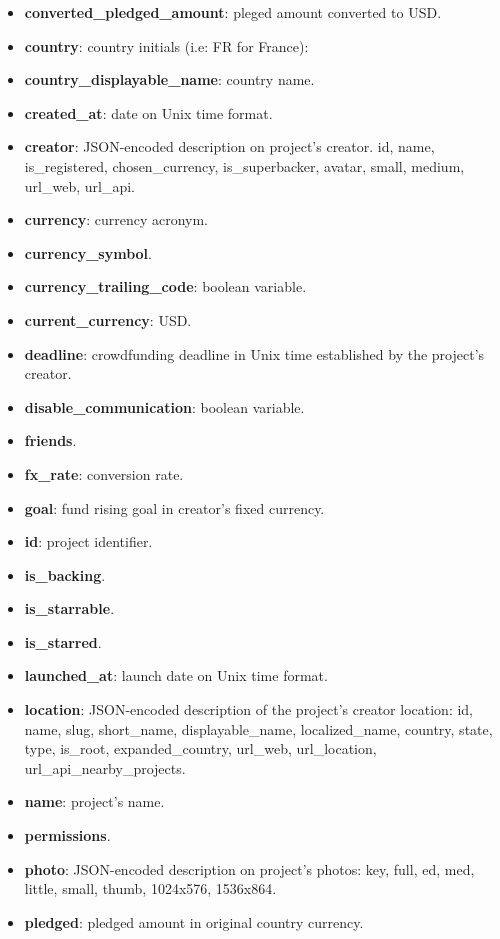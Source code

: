 \documentclass{article}
\begin{document}
{\begin{itemize}
    \item \textbf{converted\_pledged\_amount}: pleged amount converted to USD.
    \item \textbf{country}: country initials (i.e: FR for France):
    \item \textbf{country\_displayable\_name}: country name.
    \item \textbf{created\_at}: date on Unix time format.
    \item \textbf{creator}: JSON-encoded description on project's creator. id, name, is\_registered, chosen\_currency, is\_superbacker, avatar, small, medium, url\_web, url\_api. 
    \item \textbf{currency}: currency acronym.
    \item \textbf{currency\_symbol}.
    \item \textbf{currency\_trailing\_code}: boolean variable.
    \item \textbf{current\_currency}: USD.
    \item \textbf{deadline}: crowdfunding deadline in Unix time established by the project's creator.
    \item \textbf{disable\_communication}: boolean variable.
    \item \textbf{friends}.
    \item \textbf{fx\_rate}: conversion rate.
    \item \textbf{goal}: fund rising goal in creator's fixed currency.
    \item \textbf{id}: project identifier.
    \item \textbf{is\_backing}.
    \item \textbf{is\_starrable}.
    \item \textbf{is\_starred}.
    \item \textbf{launched\_at}: launch date on Unix time format.
    \item \textbf{location}: JSON-encoded description of the project's creator location: id, name, slug, short\_name, displayable\_name, localized\_name, country, state, type, is\_root, expanded\_country, url\_web, url\_location, url\_api\_nearby\_projects.
    \item \textbf{name}: project's name.
    \item \textbf{permissions}.
    \item \textbf{photo}: JSON-encoded description on project's photos: key, full, ed, med, little, small, thumb, 1024x576, 1536x864.
    \item \textbf{pledged}: pledged amount in original country currency.

\end{itemize}}
\end{document}
